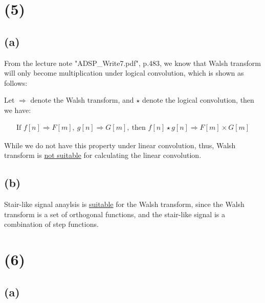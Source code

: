 \documentclass{article}
\begin{document}
\section*{(5)}

\subsection*{(a)}


From the lecture note "ADSP\_Write7.pdf", p.483, 
we know that Walsh transform will only become multiplication under logical convolution, 
which is shown as follows:
\bigskip
\begin{tcolorbox}[greenbox, title = Walsh transform: Convolution property]
Let $\Rightarrow$ denote the Walsh transform, and $\star$ denote the logical convolution, 
then we have:

\begin{align*}
    \text{If } f[n] \Rightarrow F[m], \ g[n] \Rightarrow G[m], \ \text{then } f[n] \star g[n] \Rightarrow F[m] \times G[m]
\end{align*}

\end{tcolorbox}

While we do not have this property under linear convolution,
thus, Walsh transform is \underline{not suitable} for calculating the linear convolution.

\subsection*{(b)}

Stair-like signal anaylsis is \underline{suitable} for the Walsh transform, 
since the Walsh transform is a set of orthogonal functions, 
and the stair-like signal is a combination of step functions.

\section*{(6)}

\subsection*{(a)}
\end{document}
